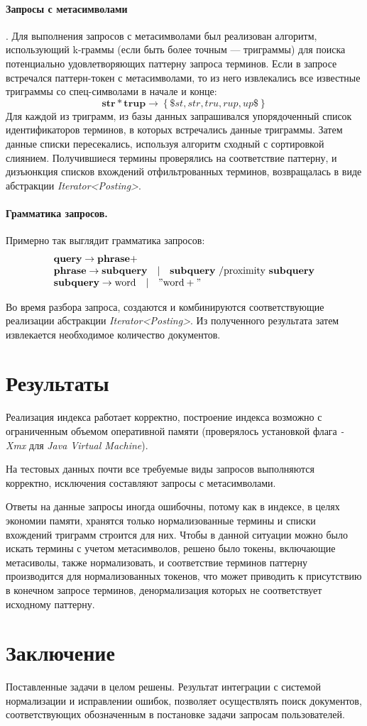 \documentclass[12pt]{article}
\begin{document}
\paragraph{Запросы с метасимволами}. Для выполнения запросов с метасимволами был
реализован алгоритм, использующий k-граммы (если быть более точным --- триграммы) для 
поиска потенциально удовлетворяющих паттерну запроса терминов.
Если в запросе встречался паттерн-токен с метасимволами, то из него извлекались все известные триграммы
со спец-символами в начале и конце:
$$
    \mathbf{str*trup} \rightarrow \left\lbrace \$st, str, tru, rup, up\$ \right\rbrace
$$
Для каждой из триграмм, из базы данных запрашивался упорядоченный список 
идентификаторов терминов, в которых встречались данные триграммы. 
Затем данные списки пересекались, используя алгоритм сходный с сортировкой слиянием.
Получившиеся термины проверялись на соответствие паттерну, и дизъюнкция 
списков вхождений отфильтрованных терминов, возвращалась в виде абстракции \emph{Iterator<Posting>}.

\paragraph{Грамматика запросов.} Примерно так выглядит грамматика запросов:
$$
\begin{array}{l}
\mathbf{query} \rightarrow \mathbf{phrase}+ \\
\mathbf{phrase} \rightarrow \mathbf{subquery} \quad | \quad  \mathbf{subquery} \ /\mathrm{proximity}\ \mathbf{subquery} \\
\mathbf{subquery} \rightarrow \mathrm{word} \quad | \quad "\mathrm{word}+"
\end{array}
$$

Во время разбора запроса, создаются и комбинируются соответствующие реализации абстракции
\emph{Iterator<Posting>}. Из полученного результата затем извлекается необходимое количество документов.

\section{Результаты}
Реализация индекса работает корректно, построение индекса возможно с 
ограниченным объемом оперативной памяти (проверялось установкой флага \emph{-Xmx}
для \emph{Java Virtual Machine}).

На тестовых данных почти все требуемые виды запросов выполняются корректно,
исключения составляют запросы с метасимволами. 

Ответы на данные запросы иногда ошибочны, потому как в индексе, в целях экономии памяти, 
хранятся только нормализованные термины и списки вхождений триграмм строится для них. 
Чтобы в данной ситуации можно было искать
термины с учетом метасимволов, решено было токены, включающие метасиволы, также
нормализовать, и соответствие терминов паттерну производится для нормализованных токенов, 
что может приводить к присутствию в конечном запросе терминов,
денормализация которых не соответствует исходному паттерну.
\section{Заключение}
Поставленные задачи в целом решены. Результат интеграции с системой нормализации и
исправлении ошибок, позволяет осуществлять поиск документов, 
соответствующих обозначенным в постановке задачи запросам пользователей.
\end{document}
